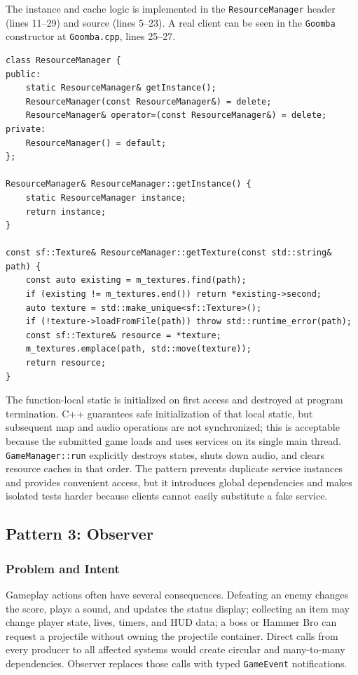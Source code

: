 \documentclass{template}
\begin{document}
The instance and cache logic is implemented in the
\texttt{ResourceManager} header (lines 11--29) and source (lines 5--23). A real
client can be seen in the
\texttt{Goomba} constructor at \texttt{Goomba.cpp}, lines 25--27.

\begin{lstlisting}[style=gamecode,basicstyle=\ttfamily\scriptsize,caption={Singleton construction, copy prevention, and lazy cache access.}]
class ResourceManager {
public:
    static ResourceManager& getInstance();
    ResourceManager(const ResourceManager&) = delete;
    ResourceManager& operator=(const ResourceManager&) = delete;
private:
    ResourceManager() = default;
};

ResourceManager& ResourceManager::getInstance() {
    static ResourceManager instance;
    return instance;
}

const sf::Texture& ResourceManager::getTexture(const std::string& path) {
    const auto existing = m_textures.find(path);
    if (existing != m_textures.end()) return *existing->second;
    auto texture = std::make_unique<sf::Texture>();
    if (!texture->loadFromFile(path)) throw std::runtime_error(path);
    const sf::Texture& resource = *texture;
    m_textures.emplace(path, std::move(texture));
    return resource;
}
\end{lstlisting}

The function-local static is initialized on first access and destroyed at
program termination. C++ guarantees safe initialization of that local static,
but subsequent map and audio operations are not synchronized; this is
acceptable because the submitted game loads and uses services on its single
main thread. \texttt{GameManager::run} explicitly destroys states, shuts down
audio, and clears resource caches in that order. The pattern prevents duplicate
service instances and provides convenient access, but it introduces global
dependencies and makes isolated tests harder because clients cannot easily
substitute a fake service.

\subsection{Pattern 3: Observer}

\subsubsection{Problem and Intent}

Gameplay actions often have several consequences. Defeating an enemy changes
the score, plays a sound, and updates the status display; collecting an item
may change player state, lives, timers, and HUD data; a boss or Hammer Bro can
request a projectile without owning the projectile container. Direct calls
from every producer to all affected systems would create circular and
many-to-many dependencies. Observer replaces those calls with typed
\texttt{GameEvent} notifications.
\end{document}
